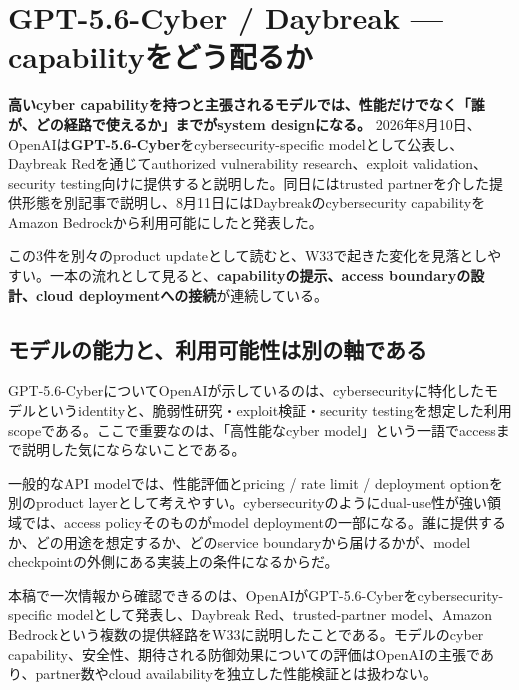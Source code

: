 \section{GPT-5.6-Cyber / Daybreak --- capabilityをどう配るか}
\label{sec:daybreak}

\textbf{高いcyber capabilityを持つと主張されるモデルでは、性能だけでなく「誰が、どの経路で使えるか」までがsystem designになる。}
2026年8月10日、OpenAIは\textbf{GPT-5.6-Cyber}をcybersecurity-specific modelとして公表し、Daybreak Redを通じてauthorized vulnerability research、exploit validation、security testing向けに提供すると説明した\cite{openai-daybreak-cyber}。同日にはtrusted partnerを介した提供形態を別記事で説明し、8月11日にはDaybreakのcybersecurity capabilityをAmazon Bedrockから利用可能にしたと発表した\cite{openai-daybreak-partners,openai-daybreak-aws}。

この3件を別々のproduct updateとして読むと、W33で起きた変化を見落としやすい。一本の流れとして見ると、\textbf{capabilityの提示、access boundaryの設計、cloud deploymentへの接続}が連続している。

\subsection*{モデルの能力と、利用可能性は別の軸である}

GPT-5.6-CyberについてOpenAIが示しているのは、cybersecurityに特化したモデルというidentityと、脆弱性研究・exploit検証・security testingを想定した利用scopeである\cite{openai-daybreak-cyber}。ここで重要なのは、「高性能なcyber model」という一語でaccessまで説明した気にならないことである。

一般的なAPI modelでは、性能評価とpricing / rate limit / deployment optionを別のproduct layerとして考えやすい。cybersecurityのようにdual-use性が強い領域では、access policyそのものがmodel deploymentの一部になる。誰に提供するか、どの用途を想定するか、どのservice boundaryから届けるかが、model checkpointの外側にある実装上の条件になるからだ。

\begin{claimboundary}
本稿で一次情報から確認できるのは、OpenAIがGPT-5.6-Cyberをcybersecurity-specific modelとして発表し、Daybreak Red、trusted-partner model、Amazon Bedrockという複数の提供経路をW33に説明したことである\cite{openai-daybreak-cyber,openai-daybreak-partners,openai-daybreak-aws}。モデルのcyber capability、安全性、期待される防御効果についての評価はOpenAIの主張であり、partner数やcloud availabilityを独立した性能検証とは扱わない。
\end{claimboundary}

